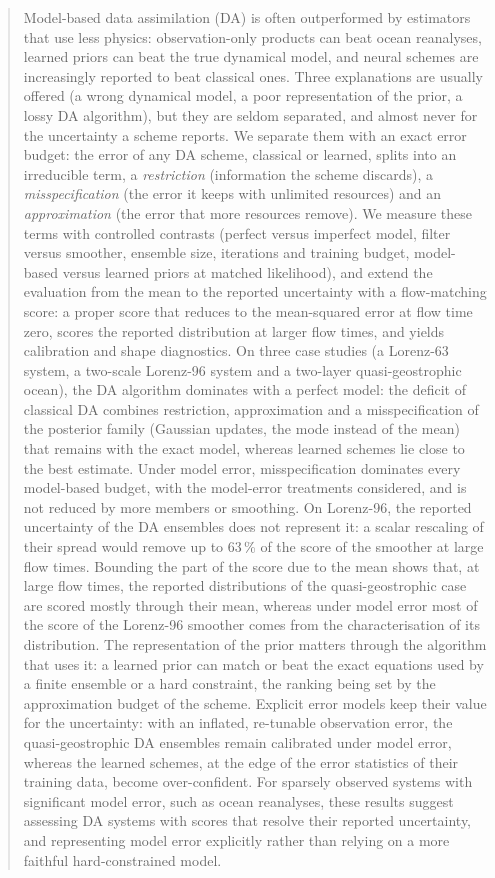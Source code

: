\begin{abstract}
Model-based data assimilation (DA) is often outperformed by estimators that use
less physics: observation-only products can beat ocean reanalyses, learned
priors can beat the true dynamical model, and neural schemes are increasingly
reported to beat classical ones. Three explanations are usually offered (a wrong
dynamical model, a poor representation of the prior, a lossy DA algorithm), but they
are seldom separated, and almost never for the uncertainty a scheme reports.
%
We separate them with an exact error budget: the error of any DA scheme, classical or
learned, splits into an irreducible term, a \emph{restriction} (information the scheme
discards), a \emph{misspecification} (the error it keeps with unlimited resources) and an
\emph{approximation} (the error that more resources remove). We measure these terms with
controlled contrasts (perfect versus imperfect model, filter versus smoother, ensemble
size, iterations and training budget, model-based versus learned priors at matched
likelihood), and extend the evaluation from the mean to the reported uncertainty with a
flow-matching score: a proper score that reduces to the mean-squared error at flow time
zero, scores the reported distribution at larger flow times, and yields calibration and
shape diagnostics.
%
On three case studies (a Lorenz-63 system, a two-scale Lorenz-96 system and a two-layer
quasi-geostrophic ocean), the DA algorithm dominates with a perfect model: the deficit of
classical DA combines restriction, approximation and a misspecification of the posterior
family (Gaussian updates, the mode instead of the mean) that remains with the exact
model, whereas learned schemes lie close to the best estimate. Under model error,
misspecification dominates every model-based budget, with the model-error treatments
considered, and is not reduced by more members or smoothing. On Lorenz-96, the reported
uncertainty of the DA ensembles does not represent it: a scalar rescaling of their spread would
remove up to 63\,\% of the score of the smoother at large flow times. Bounding the part of the score due to
the mean shows that, at large flow times, the reported distributions of the quasi-geostrophic case
are scored mostly through their mean, whereas under model error most of the score of the Lorenz-96
smoother comes from the characterisation of its distribution. The
representation of the prior matters through the algorithm that uses it: a learned prior
can match or beat the exact equations used by a finite ensemble or a hard constraint, the
ranking being set by the approximation budget of the scheme. Explicit error models keep their value for the uncertainty: with an inflated,
re-tunable observation error, the quasi-geostrophic DA ensembles remain calibrated under
model error, whereas the learned schemes, at the edge of the error statistics of their
training data, become over-confident.
%
For sparsely observed systems with significant model error, such as ocean reanalyses,
these results suggest assessing DA systems with scores that resolve their reported
uncertainty, and representing model error explicitly rather than relying on a more
faithful hard-constrained model.
\end{abstract}
